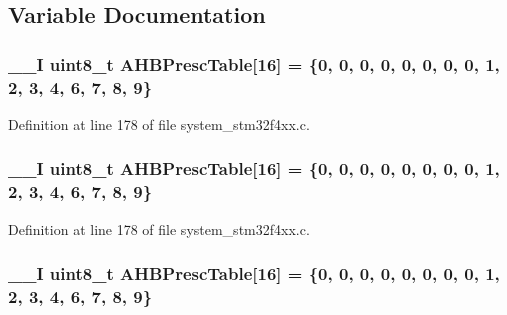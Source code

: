 \subsection{Variable Documentation}
\hypertarget{group___s_t_m32_f4xx___system___private___variables_gacdc3ef54c0704c90e69a8a84fb2d970d}{
\subsubsection[{A\-H\-B\-Presc\-Table}]{\setlength{\rightskip}{0pt plus 5cm}\-\_\-\-\_\-\-I {\bf uint8\-\_\-t} A\-H\-B\-Presc\-Table\mbox{[}16\mbox{]} = \{0, 0, 0, 0, 0, 0, 0, 0, 1, 2, 3, 4, 6, 7, 8, 9\}}}\label{group___s_t_m32_f4xx___system___private___variables_gacdc3ef54c0704c90e69a8a84fb2d970d}


Definition at line 178 of file system\-\_\-stm32f4xx.\-c.

\hypertarget{group___s_t_m32_f4xx___system___private___variables_gacdc3ef54c0704c90e69a8a84fb2d970d}{
\subsubsection[{A\-H\-B\-Presc\-Table}]{\setlength{\rightskip}{0pt plus 5cm}\-\_\-\-\_\-\-I {\bf uint8\-\_\-t} A\-H\-B\-Presc\-Table\mbox{[}16\mbox{]} = \{0, 0, 0, 0, 0, 0, 0, 0, 1, 2, 3, 4, 6, 7, 8, 9\}}}\label{group___s_t_m32_f4xx___system___private___variables_gacdc3ef54c0704c90e69a8a84fb2d970d}


Definition at line 178 of file system\-\_\-stm32f4xx.\-c.

\hypertarget{group___s_t_m32_f4xx___system___private___variables_gacdc3ef54c0704c90e69a8a84fb2d970d}{
\subsubsection[{A\-H\-B\-Presc\-Table}]{\setlength{\rightskip}{0pt plus 5cm}\-\_\-\-\_\-\-I {\bf uint8\-\_\-t} A\-H\-B\-Presc\-Table\mbox{[}16\mbox{]} = \{0, 0, 0, 0, 0, 0, 0, 0, 1, 2, 3, 4, 6, 7, 8, 9\}}}\label{group___s_t_m32_f4xx___system___private___variables_gacdc3ef54c0704c90e69a8a84fb2d970d}


